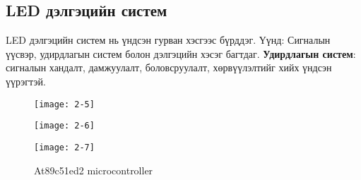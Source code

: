 \subsection{LED дэлгэцийн систем}
LED дэлгэцийн систем нь үндсэн гурван хэсгээс бүрддэг. Үүнд: Сигналын үүсвэр, удирдлагын систем болон дэлгэцийн хэсэг багтдаг.
\textbf{Удирдлагын систем}: сигналын хандалт, дамжуулалт, боловсруулалт, хөрвүүлэлтийг хийх үндсэн үүрэгтэй.
\begin{figure}[!ht]
	\centering
	\texttt{[image: 2-5]}
	\end{figure}
\begin{figure}[!ht]
	\centering
	\texttt{[image: 2-6]}
	\end{figure}
\begin{figure}[!ht]
	\centering
	\texttt{[image: 2-7]}
	\caption{At89c51ed2 microcontroller}
\end{figure}

